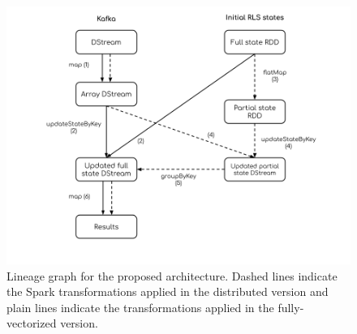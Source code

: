 \begin{figure}[H]
    \begin{center}
        \includegraphics[width=\textwidth, keepaspectratio]{imgs/lineage-graph.png}
        \caption{Lineage graph for the proposed architecture. Dashed lines indicate
            the Spark transformations applied in the distributed version
            and plain lines indicate the transformations applied in the fully-vectorized version.}
        \label{architecture}
    \end{center}
\end{figure}

